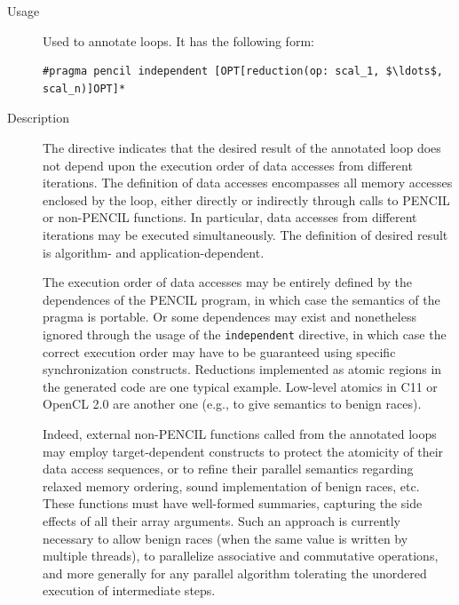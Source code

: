 \documentclass{carp}
\begin{document}
\begin{description}
\item [Usage] Used to annotate loops.
It has the following form:
\begin{lstlisting}[language=pencil]
#pragma pencil independent [OPT[reduction(op: scal_1, $\ldots$, scal_n)]OPT]*
\end{lstlisting}

\item [Description]

The directive indicates that the desired result of the annotated
loop does not depend upon the execution order of data accesses
from different iterations.  The definition of data accesses
encompasses all memory accesses enclosed by the loop, either directly
or indirectly through calls to PENCIL or non-PENCIL functions. In
particular, data accesses from different iterations may be executed
simultaneously. The definition of desired result is algorithm- and
application-dependent.

The execution order of data accesses may be entirely defined by
the dependences of the PENCIL program, in which case the semantics of
the pragma is portable. Or some dependences may exist and nonetheless
ignored through the usage of the \lstinline!independent! directive,
in which case the correct execution order may have to be guaranteed
using specific synchronization constructs.
Reductions implemented as atomic regions in the generated code are one
typical example. Low-level atomics in C11 or OpenCL 2.0 are another one
(e.g., to give semantics to benign races).

Indeed, external non-PENCIL functions called from the annotated loops
may employ target-dependent constructs to protect the atomicity of
their data access sequences, or to refine their parallel semantics
regarding relaxed memory ordering, sound implementation of benign
races, etc. These functions must have well-formed summaries, capturing
the side effects of all their array arguments.  Such an approach is
currently necessary to allow benign races (when the same value is
written by multiple threads), to parallelize associative and commutative
operations, and more generally for any parallel algorithm tolerating
the unordered execution of intermediate steps.


\end{description}
\end{document}
